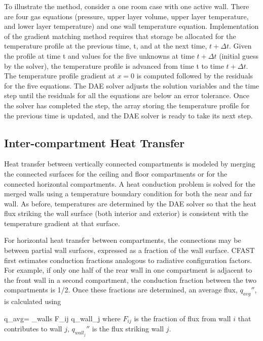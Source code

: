 To illustrate the method, consider a one room case with one active wall.  There are four gas equations (pressure, upper layer volume, upper layer temperature, and lower layer temperature) and one wall temperature equation.  Implementation of the gradient matching method requires that storage be allocated for the temperature profile at the previous time, t, and at the next time, $t + \Delta t$.  Given the profile at time t and values for the five unknowns at time $t + \Delta t$ (initial guess by the solver), the temperature profile is advanced from time t to time $t + \Delta t$.  The temperature profile gradient at $x = 0$ is computed followed by the residuals for the five equations.  The DAE solver adjusts the solution variables and the time step until the residuals for all the equations are below an error tolerance.  Once the solver has completed the step, the array storing the temperature profile for the previous time is updated, and the DAE solver is ready to take its next step.

\subsection{Inter-compartment Heat Transfer}

Heat transfer between vertically connected compartments is modeled by merging the connected surfaces for the ceiling and floor compartments or for the connected horizontal compartments.  A heat conduction problem is solved for the merged walls using a temperature boundary condition for both the near and far wall.  As before, temperatures are determined by the DAE solver so that the heat flux striking the wall surface (both interior and exterior) is consistent with the temperature gradient at that surface.

For horizontal heat transfer between compartments, the connections may be between partial wall surfaces, expressed as a fraction of the wall surface. CFAST first estimates conduction fractions analogous to radiative configuration factors.    For example, if only one half of the rear wall in one compartment is adjacent to the front wall in a second compartment, the conduction fraction between the two compartments is 1/2.   Once these fractions are determined, an average flux, $q_{avg}\dprime$, is calculated using

\be q_{avg}\dprime = \sum_{walls} F_{ij} q_{wall_j}\dprime \ee
where $F_{ij}$ is the fraction of flux from wall $i$ that contributes to wall $j$, $q_{wall_j}\dprime$ is the flux striking wall $j$.

